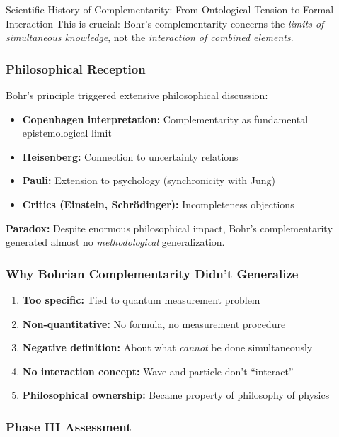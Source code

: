 \begin{chapter}{Scientific History of Complementarity: From Ontological Tension to Formal Interaction}
This is crucial: Bohr's complementarity concerns the \textit{limits of simultaneous knowledge}, not the \textit{interaction of combined elements}.

\subsubsection{Philosophical Reception}

Bohr's principle triggered extensive philosophical discussion:

\begin{itemize}[noitemsep]
    \item \textbf{Copenhagen interpretation:} Complementarity as fundamental epistemological limit
    \item \textbf{Heisenberg:} Connection to uncertainty relations
    \item \textbf{Pauli:} Extension to psychology (synchronicity with Jung)
    \item \textbf{Critics (Einstein, Schrödinger):} Incompleteness objections
\end{itemize}

\textbf{Paradox:} Despite enormous philosophical impact, Bohr's complementarity generated almost no \textit{methodological} generalization.

\subsubsection{Why Bohrian Complementarity Didn't Generalize}

\begin{enumerate}
    \item \textbf{Too specific:} Tied to quantum measurement problem
    \item \textbf{Non-quantitative:} No formula, no measurement procedure
    \item \textbf{Negative definition:} About what \textit{cannot} be done simultaneously
    \item \textbf{No interaction concept:} Wave and particle don't ``interact''
    \item \textbf{Philosophical ownership:} Became property of philosophy of physics
\end{enumerate}

\subsubsection{Phase III Assessment}


\end{chapter}

